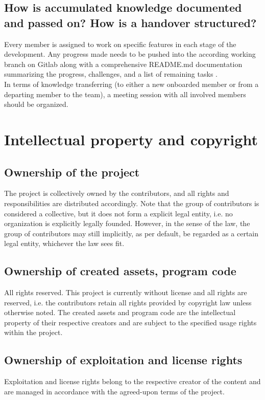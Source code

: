 \documentclass{article}
\begin{document}
\subsection{How is accumulated knowledge documented and passed on? How is a handover structured?}

Every member is assigned to work on specific features in each stage of the development.
Any progress made needs to be pushed into the according working branch on Gitlab along with a comprehensive README.md documentation summarizing the progress, challenges, and a list of remaining tasks . \\

In terms of knowledge transferring (to either a new onboarded member or from a departing member to the team), a meeting session with all involved members should be organized.

\section{Intellectual property and copyright}
\subsection{Ownership of the project}
The project is collectively owned by the contributors, and all rights and responsibilities are distributed accordingly.
Note that the group of contributors is considered a collective, but it does not form a explicit legal entity, i.e. no organization is explicitly legally founded.
However, in the sense of the law, the group of contributors may still implicitly, as per default, be regarded as a certain legal entity, whichever the law sees fit.
\subsection{Ownership of created assets, program code}
All rights reserved.
This project is currently without license and all rights are reserved, i.e. the contributors retain all rights provided by copyright law unless otherwise noted.
The created assets and program code are the intellectual property of their respective creators and are subject to the specified usage rights within the project.
\subsection{Ownership of exploitation and license rights}
Exploitation and license rights belong to the respective creator of the content and are managed in accordance with the agreed-upon terms of the project.
\end{document}
